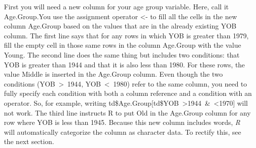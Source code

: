 \documentclass[
  12pt,
  letterpaper]{article}
\newenvironment{Shaded}{\begin{snugshade}}{\end{snugshade}}
\newcommand{\CommentTok}[1]{\textcolor[rgb]{0.37,0.37,0.37}{#1}}
\newcommand{\DecValTok}[1]{\textcolor[rgb]{0.68,0.00,0.00}{#1}}
\newcommand{\FunctionTok}[1]{\textcolor[rgb]{0.28,0.35,0.67}{#1}}
\newcommand{\NormalTok}[1]{\textcolor[rgb]{0.00,0.23,0.31}{#1}}
\newcommand{\OtherTok}[1]{\textcolor[rgb]{0.00,0.23,0.31}{#1}}
\newcommand{\SpecialCharTok}[1]{\textcolor[rgb]{0.37,0.37,0.37}{#1}}
\newcommand{\StringTok}[1]{\textcolor[rgb]{0.13,0.47,0.30}{#1}}
\renewcommand\texttt[1]{{\ttfamily\color{BrickRed}#1}}
\begin{document}
\begin{Shaded}
\end{Shaded}

First you will need a new column for your age group variable. Here, call
it \texttt{Age.Group}.You use the assignment operator
\texttt{\textless{}-} to fill all the cells in the new column
\texttt{Age.Group} based on the values that are in the already existing
\texttt{YOB} column. The first line says that for any rows in which
\texttt{YOB} is greater than 1979, fill the empty cell in those same
rows in the column \texttt{Age.Group} with the value \texttt{Young}. The
second line does the same thing but includes two conditions: that
\texttt{YOB} is greater than 1944 and that it is also less than 1980.
For these rows, the value \texttt{Middle} is inserted in the
\texttt{Age.Group} column. Even though the two conditions
(\texttt{YOB\ \textgreater{}\ 1944}, \texttt{YOB\ \textless{}\ 1980})
refer to the same column, you need to fully specify each condition with
both a column reference and a condition with an operator. So, for
example, writing
\texttt{td\$Age.Group{[}td\$YOB\ \textgreater{}1944\ \&\ \textless{}1970{]}}
will not work. The third line instructs \texttt{R} to put \texttt{Old}
in the \texttt{Age.Group} column for any row where \texttt{YOB} is less
than 1945. Because this new column includes words, \emph{R} will
automatically categorize the column as \texttt{character} data. To
rectify this, see the next section.

\begin{Shaded}
\end{Shaded}
\end{document}
